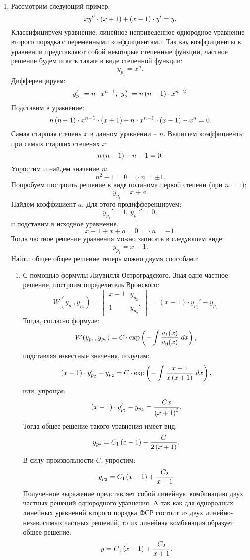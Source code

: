 		\begin{enumerate}
			\item Рассмотрим следующий пример:
				\[ xy'' \cdot \left( x + 1 \right) + \left( x - 1 \right) \cdot y' = y. \]
				Классифицируем уравнение: линейное неприведенное однородное уравнение второго порядка с переменными коэффициентами. Так как коэффициенты в уравнении представляют собой некоторые степенные функции, частное решение будем искать также в виде степенной функции:
				\[ y_{p_1} = x^n. \]
				Дифференцируем:
				\[ y_{p_1}' = n \cdot x^{n-1}, ~ y_{p_1}'' = n \left( n-1 \right) \cdot x^{n-2}. \]
				Подставим в уравнение:
				\[ n \left( n-1 \right) \cdot x^{n-1} \cdot \left( x + 1 \right) + n \cdot x^{n-1} \cdot \left( x - 1 \right) - x^n = 0. \]
				Самая старшая степень $x$ в данном уравнении -- $n$. Выпишем коэффициенты при самых старших степенях $x$:
				\[ n \left( n - 1 \right) + n - 1 = 0. \]
				Упростим и найдем значение $n$:
				\[ n^2 - 1 = 0 \implies n = \pm 1. \]
				Попробуем построить решение в виде полинома первой степени (при $n = 1$):
				\[ y_{p_1} = x + a. \]
				Найдем коэффициент $a$. Для этого продифференцируем:
				\[ y_{p_1}' = 1, ~ y_{p_1}'' = 0, \]
				и подставим в исходное уравнение:
				\[ x - 1 + x + a = 0 \implies a = -1. \]
				Тогда частное решение уравнения можно записать в следующем виде:
				\[ y_{p_1} = x - 1. \]
				Найти общее общее решение теперь можно двумя способами:
				\begin{enumerate}
					\item С помощью формулы Лиувилля-Остроградского. Зная одно частное решение, построим определитель Вронского:
						\[ W(y_{p_1}, y_{p_2}) = \begin{vmatrix}
							x - 1 & y_{p_2} \\
							1 & y_{p_2}'
						\end{vmatrix} = (x - 1) \cdot y_{p_2}' - y_{p_2}. \]
						Тогда, согласно формуле:
						\[ W(y_{p_1}, y_{p_2}) = C \cdot \exp\left( -\int \frac{a_1(x)}{a_0(x)} ~ dx \right), \]
						подставляя известные значения, получим:
						\[ (x - 1) \cdot y_{p_2}' - y_{p_2} = C \cdot \exp\left( - \int \frac{x - 1}{x \left( x + 1 \right)} ~ dx \right), \]
						или, упрощая:
						\[ (x - 1) \cdot y_{p_2}' - y_{p_2} = \frac{Cx}{\left( x + 1 \right)^2}. \]
						Тогда общее решение такого уравнения имеет вид:
						\[ y_{p_2} = C_1 \left( x - 1 \right) - \frac{C}{2 \left( x + 1 \right)}. \]
						В силу произвольности $C$, упростим:
						\[ y_{p_2} = C_1 \left( x - 1 \right) + \frac{C_2}{x + 1} \]
						Полученное выражение представляет собой линейную комбинацию двух частных решений однородного уравнения. А так как для однородных линейных уравнений второго порядка ФСР состоит из двух линейно-независимых частных решений, то их линейная комбинация образует общее решение:
						\[ y = C_1 \left( x - 1 \right) + \frac{C_2}{x + 1}. \]


\end{enumerate}
\end{enumerate}
